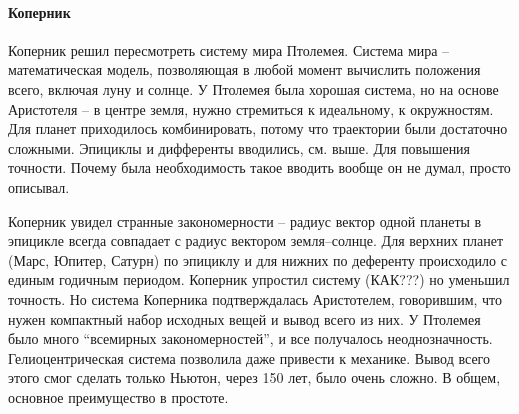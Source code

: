 \documentclass[a4paper, 12pt]{article}
\begin{document}
\paragraph{Коперник}
Коперник решил пересмотреть систему мира Птолемея. Система мира -- 
математическая модель, позволяющая в любой момент вычислить положения 
всего, включая луну и солнце. У Птолемея была хорошая система, но на 
основе Аристотеля -- в центре земля, нужно стремиться к идеальному, 
к окружностям. Для планет приходилось комбинировать, потому что 
траектории были достаточно сложными. Эпициклы и дифференты вводились, 
см. выше. Для повышения точности. Почему была необходимость такое 
вводить вообще он не думал, просто описывал.

Коперник увидел странные закономерности -- радиус вектор одной планеты 
в эпицикле всегда совпадает с радиус вектором земля--солнце. Для верхних 
планет (Марс, Юпитер, Сатурн) по эпициклу и для нижних по деференту 
происходило с единым годичным периодом. Коперник упростил систему 
(КАК???) но уменьшил точность. Но система Коперника подтверждалась 
Аристотелем, говорившим, что нужен компактный набор исходных вещей 
и вывод всего из них. У Птолемея было много ``всемирных 
закономерностей'', и все получалось неоднозначность. Гелиоцентрическая 
система позволила даже привести к механике. Вывод всего этого смог 
сделать только Ньютон, через 150 лет, было очень сложно. В общем, 
основное преимущество в простоте.
\end{document}
